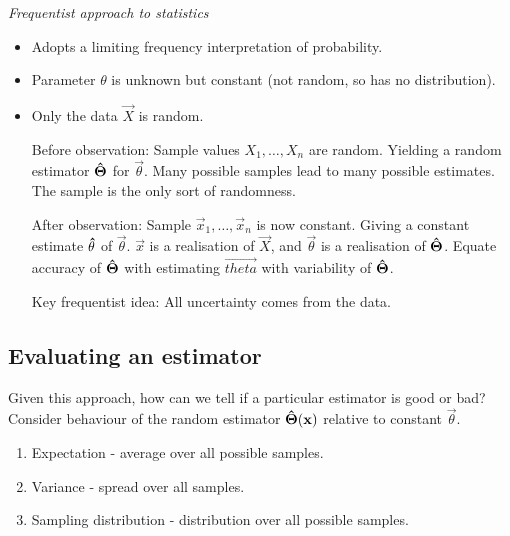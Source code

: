 \documentclass[10pt, a4paper]{article}
\begin{document}
\textit{Frequentist approach to statistics}
\begin{definition}\phantom{}
    \begin{itemize}
        \item
        Adopts a limiting frequency interpretation of probability.
        
        \item
        Parameter $\theta$ is unknown but constant
        (not random,
        so has no distribution).

        \item
        Only the data $\vec{X}$ is random.

        Before observation:
        Sample values $X_1, \dotsc, X_n$ are random.
        Yielding a random estimator $\mathbf{\hat{\Theta}}$ for $\vec{\theta}$.
        Many possible samples lead to many possible estimates.
        The sample is the only sort of randomness.


        After observation:
        Sample $\vec{x}_1, \dotsc, \vec{x}_n$ is now constant.
        Giving a constant estimate $\mathbf{\hat{\theta}}$ of $\vec{\theta}$.
        $\vec{x}$ is a realisation of $\vec{X}$,
        and $\vec{\theta}$ is a realisation of $\mathbf{\hat{\Theta}}$.
        Equate accuracy of $\mathbf{\hat{\Theta}}$ with estimating $\vec{theta}$ with variability of $\mathbf{\hat{\Theta}}$.

        Key frequentist idea:
        All uncertainty comes from the data.
    \end{itemize}
\end{definition}

\subsection{Evaluating an estimator}
Given this approach,
how can we tell if a particular estimator is good or bad?
Consider behaviour of the random estimator $\mathbf{\hat{\Theta}}(\mathbf{x})$ relative to constant $\vec{\theta}$.

\begin{enumerate}[label = (\arabic*)]
    \item Expectation - average over all possible samples.

    \item Variance - spread over all samples.

    \item Sampling distribution - distribution over all possible samples.
\end{enumerate}
\end{document}

